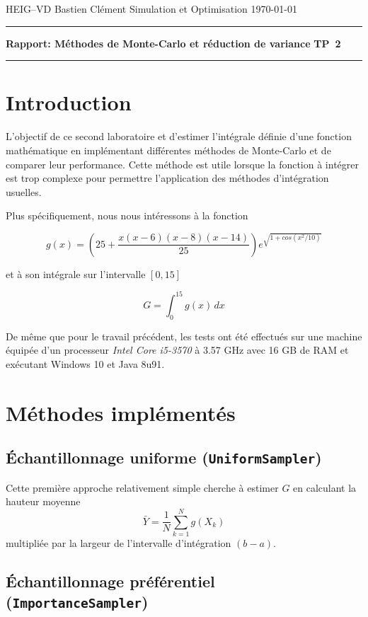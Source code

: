 \documentclass[a4paper,11pt]{article}
\begin{document}
	
{\sc HEIG--VD} \hfill Bastien Clément\newline 
Simulation et Optimisation \hfill \today \newline
\hrule
\vspace{2mm}
{\large \bf Rapport: Méthodes de Monte-Carlo et réduction de variance} \hfill {\large \bf TP~2}
\vspace{4mm}
\hrule

\tableofcontents

\section{Introduction}

L'objectif de ce second laboratoire et d'estimer l'intégrale définie d'une fonction mathématique en implémentant différentes méthodes de Monte-Carlo et de comparer leur performance. Cette méthode est utile lorsque la fonction à intégrer est trop complexe pour permettre l'application des méthodes d'intégration usuelles.

Plus spécifiquement, nous nous intéressons à la fonction

\[
	g(x) = \left( 25 + \frac{x(x-6)(x-8)(x-14)}{25} \right) e^{\sqrt{1+cos(x^2/10)}}
\]

et à son intégrale sur l'intervalle $[0,15]$

\[
	G = \int_{0}^{15} g(x) \,dx
\]

De même que pour le travail précédent, les tests ont été effectués sur une machine équipée d'un processeur \emph{Intel Core i5-3570} à 3.57 GHz avec 16 GB de RAM et exécutant Windows 10 et Java 8u91.

\section{Méthodes implémentés}

\subsection{Échantillonnage uniforme {\normalfont({\tt UniformSampler})}}

Cette première approche relativement simple cherche à estimer $G$ en calculant la hauteur moyenne
\[
	\bar{Y} = \frac{1}{N} \sum_{k=1}^{N} g(X_k)
\]
multipliée par la largeur de l'intervalle d'intégration $(b-a)$.

\subsection{Échantillonnage préférentiel {\normalfont({\tt ImportanceSampler})}}
\end{document}
